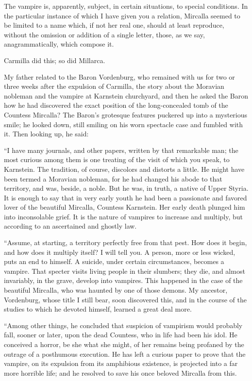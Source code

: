 \documentclass[11pt,twoside,makeidx,hidelinks,]{memoir}
\begin{document}
The vampire is, apparently, subject, in certain situations, to special
conditions. In the particular instance of which I have given you a
relation, Mircalla seemed to be limited to a name which, if not her real
one, should at least reproduce, without the omission or addition of a
single letter, those, as we say, anagrammatically, which compose it.

Carmilla did this; so did Millarca.

My father related to the Baron Vordenburg, who remained with us for two
or three weeks after the expulsion of Carmilla, the story about the
Moravian nobleman and the vampire at Karnstein churchyard, and then he
asked the Baron how he had discovered the exact position of the
long-concealed tomb of the Countess Mircalla? The Baron's grotesque
features puckered up into a mysterious smile; he looked down, still
smiling on his worn spectacle case and fumbled with it. Then looking
up, he said:

``I have many journals, and other papers, written by that remarkable man;
the most curious among them is one treating of the visit of which you
speak, to Karnstein. The tradition, of course, discolors and distorts a
little. He might have been termed a Moravian nobleman, for he had
changed his abode to that territory, and was, beside, a noble. But he
was, in truth, a native of Upper Styria. It is enough to say that in
very early youth he had been a passionate and favored lover of the
beautiful Mircalla, Countess Karnstein. Her early death plunged him into
inconsolable grief. It is the nature of vampires to increase and
multiply, but according to an ascertained and ghostly law.

``Assume, at starting, a territory perfectly free from that pest. How
does it begin, and how does it multiply itself? I will tell you. A
person, more or less wicked, puts an end to himself. A suicide, under
certain circumstances, becomes a vampire. That specter visits living
people in their slumbers; they die, and almost invariably, in the grave,
develop into vampires. This happened in the case of the beautiful
Mircalla, who was haunted by one of those demons. My ancestor,
Vordenburg, whose title I still bear, soon discovered this, and in the
course of the studies to which he devoted himself, learned a great
deal more.

``Among other things, he concluded that suspicion of vampirism would
probably fall, sooner or later, upon the dead Countess, who in life had
been his idol. He conceived a horror, be she what she might, of her
remains being profaned by the outrage of a posthumous execution. He has
left a curious paper to prove that the vampire, on its expulsion from
its amphibious existence, is projected into a far more horrible life;
and he resolved to save his once beloved Mircalla from this.
\end{document}
